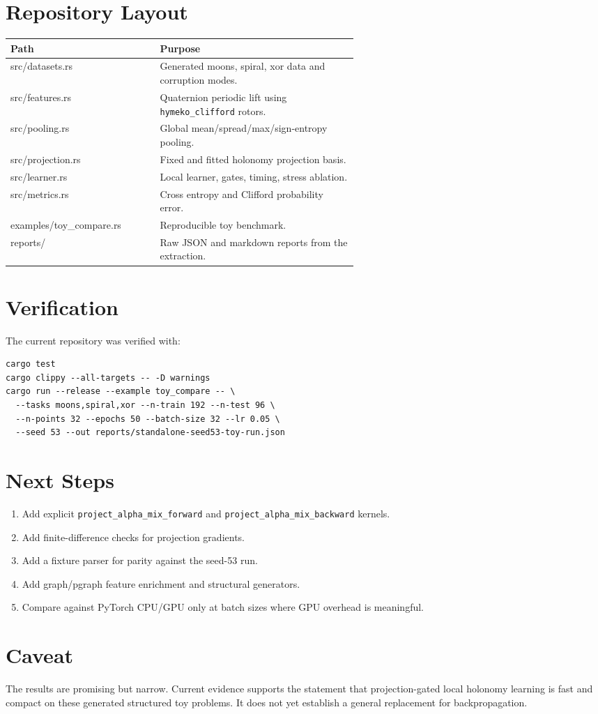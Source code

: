 \documentclass[11pt]{article}
\begin{document}
\section{Repository Layout}

\begin{center}
\begin{tabular}{>{\ttfamily}lp{0.58\linewidth}}
\toprule
Path & Purpose\\
\midrule
src/datasets.rs & Generated moons, spiral, xor data and corruption modes.\\
src/features.rs & Quaternion periodic lift using \texttt{hymeko\_clifford} rotors.\\
src/pooling.rs & Global mean/spread/max/sign-entropy pooling.\\
src/projection.rs & Fixed and fitted holonomy projection basis.\\
src/learner.rs & Local learner, gates, timing, stress ablation.\\
src/metrics.rs & Cross entropy and Clifford probability error.\\
examples/toy\_compare.rs & Reproducible toy benchmark.\\
reports/ & Raw JSON and markdown reports from the extraction.\\
\bottomrule
\end{tabular}
\end{center}

\section{Verification}

The current repository was verified with:

\begin{verbatim}
cargo test
cargo clippy --all-targets -- -D warnings
cargo run --release --example toy_compare -- \
  --tasks moons,spiral,xor --n-train 192 --n-test 96 \
  --n-points 32 --epochs 50 --batch-size 32 --lr 0.05 \
  --seed 53 --out reports/standalone-seed53-toy-run.json
\end{verbatim}

\section{Next Steps}

\begin{enumerate}
  \item Add explicit \texttt{project\_alpha\_mix\_forward} and
        \texttt{project\_alpha\_mix\_backward} kernels.
  \item Add finite-difference checks for projection gradients.
  \item Add a fixture parser for parity against the seed-53 run.
  \item Add graph/pgraph feature enrichment and structural generators.
  \item Compare against PyTorch CPU/GPU only at batch sizes where GPU overhead
        is meaningful.
\end{enumerate}

\section{Caveat}

The results are promising but narrow. Current evidence supports the statement
that projection-gated local holonomy learning is fast and compact on these
generated structured toy problems. It does not yet establish a general
replacement for backpropagation.
\end{document}
